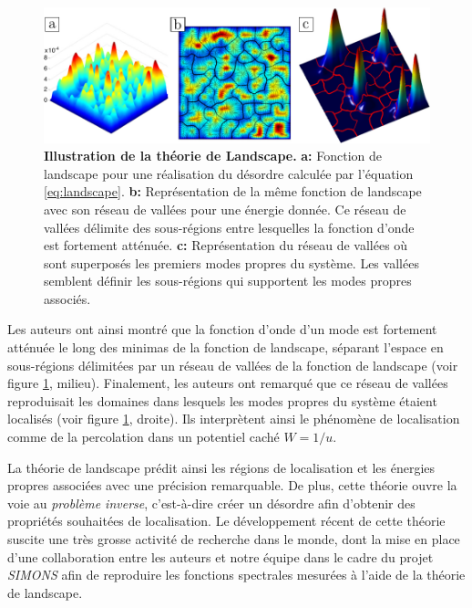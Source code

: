 \begin{figure}
\centering
\includegraphics[width=\textwidth]{Fig/Conclusion/landscape.pdf}
\caption{\textbf{Illustration de la théorie de Landscape.} \textbf{a:} Fonction de landscape pour une réalisation du désordre calculée par l'équation \ref{eq:landscape}. \textbf{b:} Représentation de la même fonction de landscape avec son réseau de vallées pour une énergie donnée. Ce réseau de vallées délimite des sous-régions entre lesquelles la fonction d'onde est fortement atténuée. \textbf{c:} Représentation du réseau de vallées où sont superposés les premiers modes propres du système. Les vallées semblent définir les sous-régions qui supportent les modes propres associés.}
\label{fig:landscape}
\end{figure}

Les auteurs ont ainsi montré que la fonction d'onde d'un mode est fortement atténuée le long des minimas de la fonction de landscape, séparant l'espace en sous-régions délimitées par un réseau de vallées de la fonction de landscape (voir figure \ref{fig:landscape}, milieu). Finalement, les auteurs ont remarqué que ce réseau de vallées reproduisait les domaines dans lesquels les modes propres du système étaient localisés (voir figure \ref{fig:landscape}, droite). Ils interprètent ainsi le phénomène de localisation comme de la percolation dans un potentiel caché $W=1/u$.

La théorie de landscape prédit ainsi les régions de localisation et les énergies propres associées avec une précision remarquable. De plus, cette théorie ouvre la voie au \emph{problème inverse}, c'est-à-dire créer un désordre afin d'obtenir des propriétés souhaitées de localisation. Le développement récent de cette théorie suscite une très grosse activité de recherche dans le monde, dont la mise en place d'une collaboration entre les auteurs et notre équipe dans le cadre du projet \emph{SIMONS} afin de reproduire les fonctions spectrales mesurées à l'aide de la théorie de landscape.





